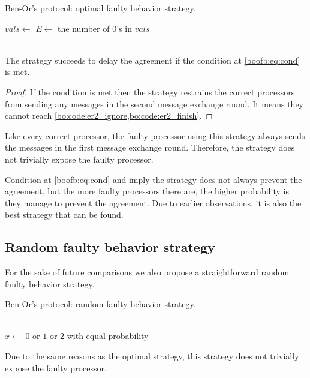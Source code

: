 \begin{breakablealgorithm}
  \caption{Ben-Or's protocol: optimal faulty behavior strategy.}
  \begin{algorithmic}[1]
        \State $vals \gets$ 
        \State $E \gets$ the number of $0$'s in $vals$
         \label{boofb:code:er0_if}
            \State {}
        \Else
            \State {}
        \EndIf
        \\
        \State {}
        \\
        \State {}
    \EndWhile
  \end{algorithmic}
\end{breakablealgorithm}

\begin{lemma}\label{boofb:lem:correct}
The strategy succeeds to delay the agreement if the condition at \cref{boofb:eq:cond} is met.
\end{lemma}
\begin{proof}
If the condition is met then the strategy restrains the correct processors from sending any messages in the second message exchange round. It means they cannot reach \cref{bo:code:er2_ignore,bo:code:er2_finish}.
\end{proof}

Like every correct processor, the faulty processor using this strategy always sends the messages in the first message exchange round. Therefore, the strategy does not trivially expose the faulty processor.

Condition at \cref{boofb:eq:cond} and  imply the strategy does not always prevent the agreement, but the more faulty processors there are, the higher probability is they manage to prevent the agreement. Due to earlier observations, it is also the best strategy that can be found.

\subsection{Random faulty behavior strategy}
For the sake of future comparisons we also propose a straightforward random faulty behavior strategy.
\begin{breakablealgorithm}
  \caption{Ben-Or's protocol: random faulty behavior strategy.}
  \begin{algorithmic}[1]
                \State {}
            \EndIf
        \EndFor
        \\
        \State {}
            \State $x \gets$ $0$ or $1$ or $2$ with equal probability
                \State {}
            \EndIf
        \EndFor
        \\
        \State {}
    \EndWhile
  \end{algorithmic}
\end{breakablealgorithm}
Due to the same reasons as the optimal strategy, this strategy does not trivially expose the faulty processor.

